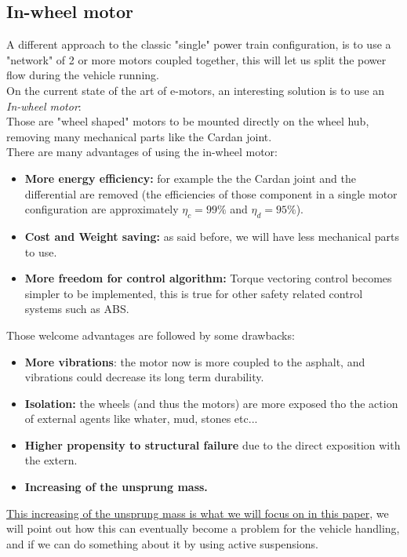 \documentclass{article}
\numberwithin{equation}{section}
\numberwithin{figure}{section}
\numberwithin{table}{section}
\numberwithin{table}{section}
\begin{document}
\subsection{In-wheel motor}
A different approach to the classic "single" power train configuration, is to use a "network" of 2 or more motors coupled together, this will let us split the power flow during the vehicle running.\\
On the current state of the art of e-motors, an interesting solution is to use an \emph{In-wheel motor}:\\
Those are "wheel shaped" motors to be mounted directly on the wheel hub, removing many mechanical parts like the Cardan joint.\\
There are many advantages of using the in-wheel motor:
\begin{itemize}
    \item \textbf{More energy efficiency:} for example the the Cardan joint and the differential are removed (the efficiencies of those component in a single motor configuration are approximately $\eta_c=99\%$ and $\eta_d=95\%$).
    \item \textbf{Cost and Weight saving:} as said before, we will have less mechanical parts to use.
    \item \textbf{More freedom for control algorithm:} Torque vectoring control becomes simpler to be implemented, this is true for other safety related control systems such as ABS.
\end{itemize}
Those welcome advantages are followed by some drawbacks:
\begin{itemize}
    \item \textbf{More vibrations}: the motor now is more coupled to the asphalt, and vibrations could decrease its long term durability.
    \item \textbf{Isolation:} the wheels (and thus the motors) are more exposed tho the action of external agents like whater, mud, stones etc...
    \item \textbf{Higher propensity to structural failure} due to the direct exposition with the extern.
    \item \textbf{Increasing of the unsprung mass.} 
\end{itemize}
\underline{This increasing of the unsprung mass is what we will focus on in this paper}, we will point out how this can eventually become a problem for the vehicle handling, and if we can do something about it by using active suspensions.
\end{document}
